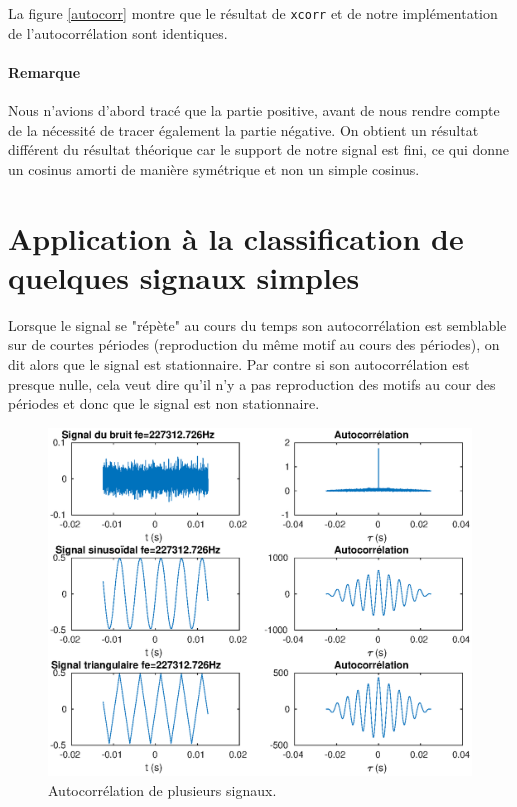 \documentclass[french]{article}
\begin{document}
La figure \ref{autocorr} montre que le résultat de \verb`xcorr` et de notre implémentation de l'autocorrélation sont identiques.

\paragraph{Remarque}
Nous n'avions d'abord tracé que la partie positive, avant de nous rendre compte de la nécessité de tracer également la partie négative.
On obtient un résultat différent du résultat théorique car le support de notre signal est fini, ce qui donne un cosinus amorti de manière symétrique et non un simple cosinus.

\section{ Application à la classification de quelques signaux simples}

Lorsque le signal se "répète" au cours du temps son autocorrélation est semblable sur de courtes périodes (reproduction du même motif au cours des périodes), on dit alors que le signal est stationnaire. Par contre si son autocorrélation est presque nulle, cela veut dire qu'il n'y a pas reproduction des motifs au cour des périodes et donc que le signal est non stationnaire.

\begin{figure}[h!]
	\centering
	\includegraphics[width=1\textwidth]{images/classificationSig.eps}
	\caption{Autocorrélation de plusieurs signaux.}
	\label{classifSig}
\end{figure}
\end{document}
